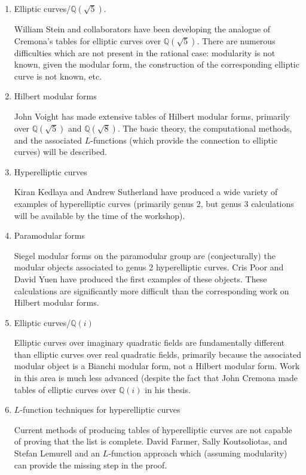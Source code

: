 \documentclass[amstex,11pt]{amsart}
\numberwithin{equation}{section}
\newcommand{\Q}{\mathbb Q}
\begin{document}
\begin{enumerate}
\item  Elliptic curves/$\Q(\sqrt{5})$.

\noindent
William Stein and collaborators have been developing the analogue of
Cremona's tables for elliptic curves over $\Q(\sqrt{5})$.  There are
numerous difficulties which are not present in the rational case:
modularity is not known, given the modular form, the construction of
the corresponding elliptic curve is not known, etc.


\item Hilbert modular forms

\noindent
John Voight has made extensive tables of Hilbert modular forms,
primarily over $\Q(\sqrt{5})$ and $\Q(\sqrt{8})$.  The basic
theory, the computational methods, and the associated $L$-functions
(which provide the connection to elliptic curves) will be
described.


\item  Hyperelliptic curves

\noindent
Kiran Kedlaya and Andrew Sutherland have produced a wide variety
of examples of hyperelliptic curves (primarily genus 2, but genus 3
calculations will be available by the time of the workshop).


\item  Paramodular forms

\noindent
Siegel modular forms on the paramodular group are (conjecturally) the
modular objects associated to genus 2 hyperelliptic curves.
Cris Poor and David Yuen have produced the first examples of these
objects.  These calculations are significantly more difficult than
the corresponding work on Hilbert modular forms.


\item  Elliptic curves/$\Q(i)$

\noindent
Elliptic curves over imaginary quadratic fields are fundamentally
different than elliptic curves over real quadratic fields, primarily
because the associated modular object is a Bianchi modular form,
not a Hilbert modular form.  Work in this area is much less advanced
(despite the fact that John Cremona made tables of elliptic curves
over $\Q(i)$ in his thesis.


\item  $L$-function techniques for hyperelliptic curves

\noindent
Current methods of producing tables of hyperelliptic curves are not
capable of proving that the list is complete.  David Farmer, Sally
Koutsoliotas, and Stefan Lemurell and an $L$-function approach which
(assuming modularity) can provide the missing step in the proof.

\end{enumerate}
\end{document}
